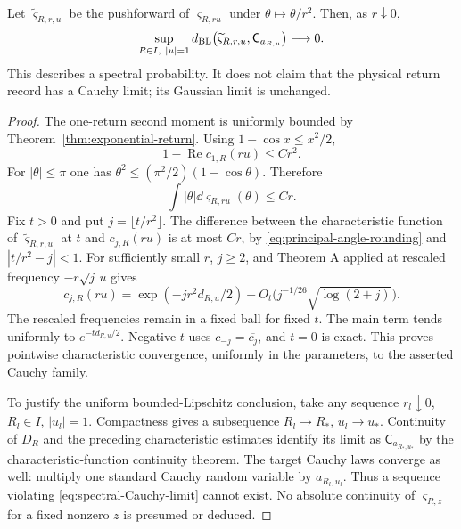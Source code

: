 \begin{theorem}
\label{thm:spectral-Cauchy-limit}
Let $\widetilde\varsigma_{R,r,u}$ be the pushforward of
$\varsigma_{R,ru}$ under $\theta\mapsto\theta/r^2$.
Then, as $r\downarrow0$,
\begin{equation}\label{eq:spectral-Cauchy-limit}
 \sup_{R\in I,\ |u|=1}
 d_{\rm BL}\bigl(\widetilde\varsigma_{R,r,u},
                         \mathsf C_{a_{R,u}}\bigr)\longrightarrow0.
\end{equation}
This describes a spectral probability. It does not claim that the
physical return record has a Cauchy limit; its Gaussian limit is
unchanged.
\end{theorem}
\begin{proof}
The one-return second moment is uniformly bounded by
Theorem~\ref{thm:exponential-return}. Using $1-\cos x\le x^2/2$,
\[
 1-\operatorname{Re}c_{1,R}(ru)
      \le Cr^2.
\]
For $|\theta|\le\pi$ one has
$\theta^2\le(\pi^2/2)(1-\cos\theta)$. Therefore
\begin{equation}\label{eq:principal-angle-rounding}
 \int|\theta|\dd\varsigma_{R,ru}(\theta)\le Cr.
\end{equation}
Fix $t>0$ and put $j=\lfloor t/r^2\rfloor$. The difference between
the characteristic function of $\widetilde\varsigma_{R,r,u}$ at $t$
and $c_{j,R}(ru)$ is at most $Cr$, by
\eqref{eq:principal-angle-rounding} and $|t/r^2-j|<1$.
For sufficiently small $r$, $j\ge2$, and Theorem A applied at
rescaled frequency $-r\sqrt j\,u$ gives
\[
 c_{j,R}(ru)=\exp(-jr^2d_{R,u}/2)+
               O_t\bigl(j^{-1/26}\sqrt{\log(2+j)}\bigr).
\]
The rescaled frequencies remain in a fixed ball for fixed $t$.
The main term tends uniformly to $e^{-td_{R,u}/2}$. Negative $t$
uses $c_{-j}=\overline{c_j}$, and $t=0$ is exact. This proves
pointwise characteristic convergence, uniformly in the parameters,
to the asserted Cauchy family.

To justify the uniform bounded-Lipschitz conclusion, take any sequence
$r_l\downarrow0$, $R_l\in I$, $|u_l|=1$. Compactness gives a
subsequence $R_l\to R_*$, $u_l\to u_*$. Continuity of $D_R$ and the
preceding characteristic estimates identify its limit as
$\mathsf C_{a_{R_*,u_*}}$ by the characteristic-function continuity
theorem. The target Cauchy laws converge as well: multiply one standard
Cauchy random variable by $a_{R_l,u_l}$. Thus a sequence violating
\eqref{eq:spectral-Cauchy-limit} cannot exist. No absolute continuity
of $\varsigma_{R,z}$ for a fixed nonzero $z$ is presumed or deduced.
\end{proof}

